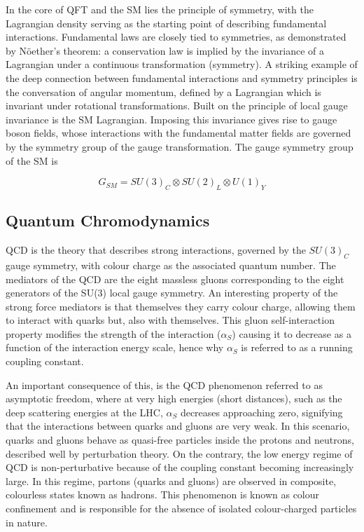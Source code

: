 In the core of QFT and the SM lies the principle of symmetry, with the Lagrangian density serving as the starting point of describing fundamental interactions. Fundamental laws are closely tied to symmetries, as demonstrated by N\"{o}ether's theorem: a conservation law is implied by the invariance of a Lagrangian under a continuous transformation (symmetry). A striking example of the deep connection between fundamental interactions and symmetry principles is the conversation of angular momentum, defined by a Lagrangian which is invariant under rotational transformations. Built on the principle of local gauge invariance is the SM Lagrangian. Imposing this invariance gives rise to gauge boson fields, whose interactions with the fundamental matter fields are governed by the symmetry group of the gauge transformation. The gauge symmetry group of the SM is

\begin{equation}
G_{SM} = SU(3)_{C} \otimes SU(2)_{L} \otimes U(1)_{Y}
\end{equation}

\subsection{Quantum Chromodynamics}

\ac{QCD} is the theory that describes strong interactions, governed by the $SU(3)_{C}$ gauge symmetry, with colour charge as the associated quantum number. The mediators of the QCD are the eight massless gluons corresponding to the eight generators of the SU(3) local gauge symmetry. An interesting property of the strong force mediators is that themselves they carry colour charge, allowing them to interact with quarks but, also with themselves. This gluon self-interaction property modifies the strength of the interaction ($\alpha_{S}$) causing it to decrease as a function of the interaction energy scale, hence why $\alpha_{S}$ is referred to as a running coupling constant.

An important consequence of this, is the QCD phenomenon referred to as asymptotic freedom, where at very high energies (short distances), such as the deep scattering energies at the LHC, $\alpha_{S}$ decreases approaching zero, signifying that the interactions between quarks and gluons are very weak. In this scenario, quarks and gluons behave as quasi-free particles inside the protons and neutrons, described well by perturbation theory. On the contrary, the  low energy regime of QCD is non-perturbative because of the coupling constant becoming increasingly large. In this regime, partons (quarks and gluons) are observed in composite, colourless states known as hadrons. This phenomenon is known as colour confinement and is responsible for the absence of isolated colour-charged particles in nature. 


